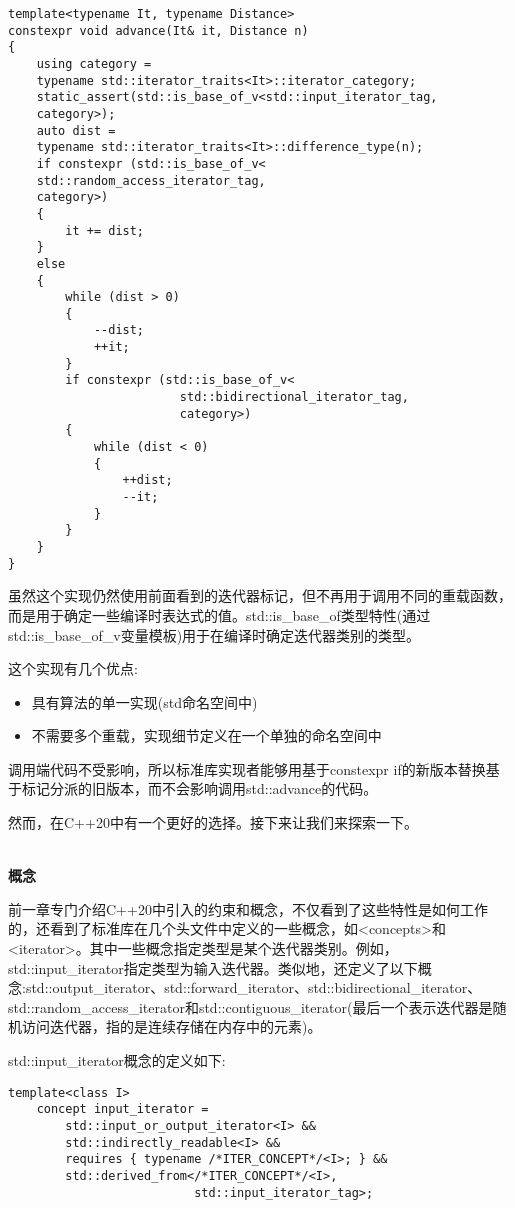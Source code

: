 \begin{lstlisting}[style=styleCXX]
template<typename It, typename Distance>
constexpr void advance(It& it, Distance n)
{
	using category =
	typename std::iterator_traits<It>::iterator_category;
	static_assert(std::is_base_of_v<std::input_iterator_tag,
	category>);
	auto dist =
	typename std::iterator_traits<It>::difference_type(n);
	if constexpr (std::is_base_of_v<
	std::random_access_iterator_tag,
	category>)
	{
		it += dist;
	}
	else
	{
		while (dist > 0)
		{
			--dist;
			++it;
		}
		if constexpr (std::is_base_of_v<
						std::bidirectional_iterator_tag,
						category>)
		{
			while (dist < 0)
			{
				++dist;
				--it;
			}
		}
	}
}
\end{lstlisting}

虽然这个实现仍然使用前面看到的迭代器标记，但不再用于调用不同的重载函数，而是用于确定一些编译时表达式的值。std::is\_base\_of类型特性(通过std::is\_base\_of\_v变量模板)用于在编译时确定迭代器类别的类型。

这个实现有几个优点:

\begin{itemize}
\item
具有算法的单一实现(std命名空间中)

\item
不需要多个重载，实现细节定义在一个单独的命名空间中
\end{itemize}

调用端代码不受影响，所以标准库实现者能够用基于constexpr if的新版本替换基于标记分派的旧版本，而不会影响调用std::advance的代码。

然而，在C++20中有一个更好的选择。接下来让我们来探索一下。

\noindent
\hspace*{\fill} \\ %
\textbf{概念}

前一章专门介绍C++20中引入的约束和概念，不仅看到了这些特性是如何工作的，还看到了标准库在几个头文件中定义的一些概念，如<concepts>和<iterator>。其中一些概念指定类型是某个迭代器类别。例如，std::input\_iterator指定类型为输入迭代器。类似地，还定义了以下概念:std::output\_iterator、std::forward\_iterator、std::bidirectional\_iterator、std::random\_access\_iterator和std::contiguous\_iterator(最后一个表示迭代器是随机访问迭代器，指的是连续存储在内存中的元素)。

std::input\_iterator概念的定义如下:

\begin{lstlisting}[style=styleCXX]
template<class I>
	concept input_iterator =
		std::input_or_output_iterator<I> &&
		std::indirectly_readable<I> &&
		requires { typename /*ITER_CONCEPT*/<I>; } &&
		std::derived_from</*ITER_CONCEPT*/<I>,
						  std::input_iterator_tag>;
\end{lstlisting}


